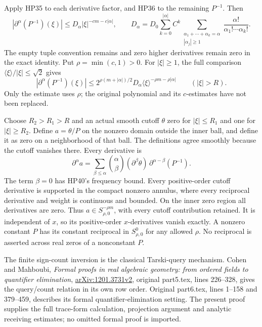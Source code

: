 \documentclass[
  11pt,
]{article}
\begin{document}
Apply HP35 to each derivative factor, and HP36 to the remaining
\(P^{-1}\). Then \[
|\partial^\alpha(P^{-1})(\xi)|
\leq D_\alpha|\xi|^{-cm-c|\alpha|},\qquad
D_\alpha=D_0\sum_{k=0}^{|\alpha|}C^k
\!\!\sum_{\substack{\alpha_1+\cdots+\alpha_k=\alpha\\|\alpha_j|\geq1}}
\frac{\alpha!}{\alpha_1!\cdots\alpha_k!}.
\tag{HP39}
\] The empty tuple convention remains and zero higher derivatives remain
zero in the exact identity. Put \(\rho=\min(c,1)>0\). For
\(|\xi|\geq1\), the full comparison
\(\langle\xi\rangle/|\xi|\leq\sqrt2\) gives \[
|\partial^\alpha(P^{-1})(\xi)|
\leq 2^{\rho(m+|\alpha|)/2}D_\alpha
\langle\xi\rangle^{-\rho m-\rho|\alpha|}
\qquad(|\xi|>R).
\tag{HP40}
\] Only the estimate uses \(\rho\); the original polynomial and its
\(c\)-estimates have not been replaced.

Choose \(R_2>R_1>R\) and an actual smooth cutoff \(\theta\) zero for
\(|\xi|\leq R_1\) and one for \(|\xi|\geq R_2\). Define \(a=\theta/P\)
on the nonzero domain outside the inner ball, and define it as zero on a
neighborhood of that ball. The definitions agree smoothly because the
cutoff vanishes there. Every derivative is \[
\partial^\alpha a=
\sum_{\beta\leq\alpha}\binom{\alpha}{\beta}
(\partial^\beta\theta)\,\partial^{\alpha-\beta}(P^{-1}).
\tag{HP41}
\] The term \(\beta=0\) has HP40's frequency bound. Every positive-order
cutoff derivative is supported in the compact nonzero annulus, where
every reciprocal derivative and weight is continuous and bounded. On the
inner zero region all derivatives are zero. Thus
\(a\in S^{-\rho m}_{\rho,0}\), with every cutoff contribution retained.
It is independent of \(x\), so its positive-order \(x\)-derivatives
vanish exactly. A nonzero constant \(P\) has its constant reciprocal in
\(S^0_{\rho,0}\) for any allowed \(\rho\). No reciprocal is asserted
across real zeros of a nonconstant \(P\).

The finite sign-count inversion is the classical Tarski-query mechanism.
Cohen and Mahboubi, \emph{Formal proofs in real algebraic geometry: from
ordered fields to quantifier elimination},
\href{https://arxiv.org/abs/1201.3731v2}{arXiv:1201.3731v2}, original
part5.tex, lines 226--328, gives the query/count relation in its own row
order. Original part6.tex, lines 1--158 and 379--459, describes its
formal quantifier-elimination setting. The present proof supplies the
full trace-form calculation, projection argument and analytic receiving
estimates; no omitted formal proof is imported.
\end{document}
